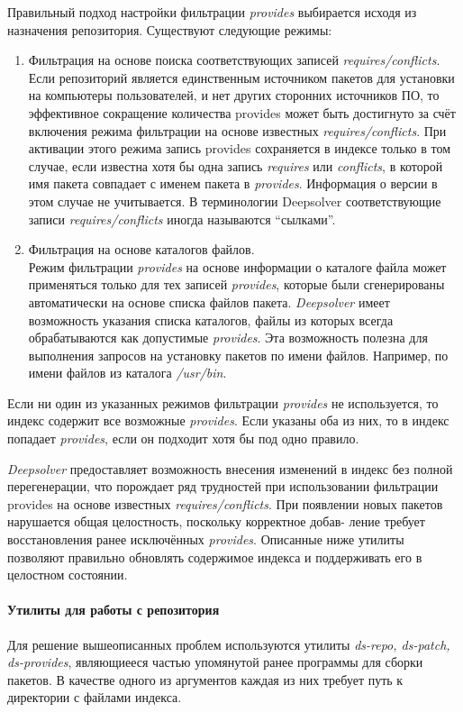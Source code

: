 Правильный подход настройки фильтрации \textit{provides} выбирается исходя
из назначения репозитория. Существуют следующие режимы:
\begin{enumerate}
\item{ Фильтрация на основе поиска соответствующих записей \textit{requires/conflicts}.\\
Если репозиторий является единственным источником пакетов для установки
на компьютеры пользователей, и нет других сторонних источников ПО, 
то эффективное сокращение количества provides может быть
достигнуто за счёт включения режима фильтрации на основе известных
\textit{requires/conflicts}. При активации этого режима запись provides сохраняется
в индексе только в том случае, если известна хотя бы одна запись
\textit{requires} или \textit{conflicts}, в которой имя пакета совпадает с именем пакета
в \textit{provides}. Информация о версии в этом случае не учитывается. В терминологии 
Deepsolver соответствующие записи \textit{requires/conflicts} иногда называются ``сылками''.}
\item{ Фильтрация на основе каталогов файлов.\\
 Режим фильтрации \textit{provides} на основе информации о каталоге файла может применяться только для
тех записей \textit{provides}, которые были сгенерированы автоматически на основе
 списка файлов пакета. \textit{Deepsolver} имеет возможность указания списка
каталогов, файлы из которых всегда обрабатываются как допустимые
\textit{provides}. Эта возможность полезна для выполнения запросов на установку
 пакетов по имени файлов. Например, по имени файлов из каталога
\textit{/usr/bin}.}
\end{enumerate}
Если ни один из указанных режимов фильтрации \textit{provides} не используется,
то индекс содержит все возможные \textit{provides}. Если указаны оба из них, то
в индекс попадает \textit{provides}, если он подходит хотя бы под одно правило.

\textit{Deepsolver} предоставляет возможность внесения изменений в индекс без
полной перегенерации, что порождает ряд трудностей при использовании
фильтрации provides на основе известных \textit{requires/conflicts}. При появлении
новых пакетов нарушается общая целостность, поскольку корректное добав-
ление требует восстановления ранее исключённых \textit{provides}. Описанные ниже
утилиты позволяют правильно обновлять содержимое индекса и поддерживать
его в целостном состоянии.

\paragraph{Утилиты для работы с репозитория\\}
Для решение вышеописанных проблем используются утилиты \textit{ds-repo, ds-patch, ds-provides},
являющиееся частью упомянутой ранее программы для сборки пакетов.
В качестве одного из аргументов каждая из них требует путь к директории
 с файлами индекса.\\

